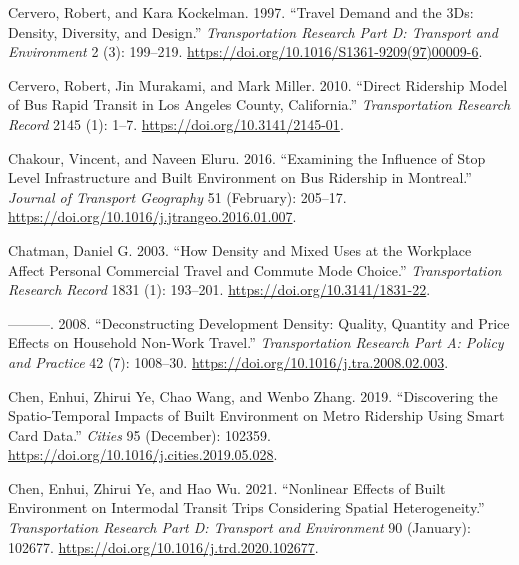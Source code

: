 \documentclass[
  11pt,
  openany]{memoir}
\newlength{\cslhangindent}
\newlength{\cslentryspacingunit} %
\newenvironment{CSLReferences}[2] %
 {%
  \setlength{\parindent}{0pt}
  \ifodd #1
  \let\oldpar\par
  \def\par{\hangindent=\cslhangindent\oldpar}
  \fi
  \setlength{\parskip}{#2\cslentryspacingunit}
 }%
 {}
\begin{document}
\begin{CSLReferences}{1}{0}
\leavevmode{}%
Cervero, Robert, and Kara Kockelman. 1997. {``Travel Demand and the {3Ds}: Density, Diversity, and Design.''} \emph{Transportation Research Part D: Transport and Environment} 2 (3): 199--219. \url{https://doi.org/10.1016/S1361-9209(97)00009-6}.

\leavevmode{}%
Cervero, Robert, Jin Murakami, and Mark Miller. 2010. {``Direct {Ridership Model} of {Bus Rapid Transit} in {Los Angeles County}, {California}.''} \emph{Transportation Research Record} 2145 (1): 1--7. \url{https://doi.org/10.3141/2145-01}.

\leavevmode{}%
Chakour, Vincent, and Naveen Eluru. 2016. {``Examining the Influence of Stop Level Infrastructure and Built Environment on Bus Ridership in {Montreal}.''} \emph{Journal of Transport Geography} 51 (February): 205--17. \url{https://doi.org/10.1016/j.jtrangeo.2016.01.007}.

\leavevmode{}%
Chatman, Daniel G. 2003. {``How {Density} and {Mixed Uses} at the {Workplace Affect Personal Commercial Travel} and {Commute Mode Choice}.''} \emph{Transportation Research Record} 1831 (1): 193--201. \url{https://doi.org/10.3141/1831-22}.

\leavevmode{}%
---------. 2008. {``Deconstructing Development Density: Quality, Quantity and Price Effects on Household Non-Work Travel.''} \emph{Transportation Research Part A: Policy and Practice} 42 (7): 1008--30. \url{https://doi.org/10.1016/j.tra.2008.02.003}.

\leavevmode{}%
Chen, Enhui, Zhirui Ye, Chao Wang, and Wenbo Zhang. 2019. {``Discovering the Spatio-Temporal Impacts of Built Environment on Metro Ridership Using Smart Card Data.''} \emph{Cities} 95 (December): 102359. \url{https://doi.org/10.1016/j.cities.2019.05.028}.

\leavevmode{}%
Chen, Enhui, Zhirui Ye, and Hao Wu. 2021. {``Nonlinear Effects of Built Environment on Intermodal Transit Trips Considering Spatial Heterogeneity.''} \emph{Transportation Research Part D: Transport and Environment} 90 (January): 102677. \url{https://doi.org/10.1016/j.trd.2020.102677}.


\end{CSLReferences}
\end{document}
